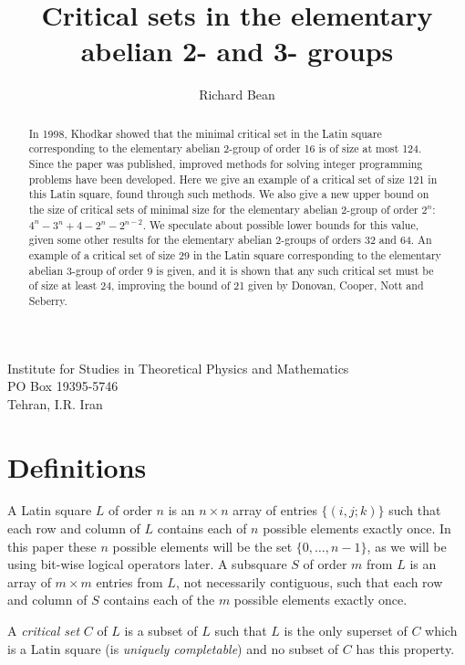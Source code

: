 \documentclass{article}
\title{Critical sets in the elementary abelian 2- and 3- groups}
\author{Richard Bean}
\date{}
\begin{document}
\maketitle

\begin{center}
Institute for Studies in Theoretical Physics and Mathematics \\
PO Box 19395-5746 \\
Tehran, I.R. Iran \\
\end{center}

\begin{abstract}

In 1998, Khodkar showed that the minimal critical set in the Latin
square corresponding to the elementary abelian 2-group of order 16
is of size at most 124.  Since the paper was published, improved
methods for solving integer programming problems have been
developed.  Here we give an example of a critical set of size 121
in this Latin square, found through such methods. We also give a
new upper bound on the size of critical sets of minimal size for
the elementary abelian 2-group of order $2^n$:
$4^{n}-3^{n}+4-2^{n}-2^{n-2}$. We speculate about possible lower
bounds for this value, given some other results for the elementary
abelian 2-groups of orders 32 and 64. An example of a critical set
of size 29 in the Latin square corresponding to the elementary
abelian 3-group of order 9 is given, and it is shown that any such
critical set must be of size at least 24, improving the bound of
21 given by Donovan, Cooper, Nott and Seberry.

\end{abstract}

\section{Definitions}
A Latin square $L$ of order $n$ is an $n \times n$ array of
entries $\{ (i,j;k) \}$ such that each row and column of $L$
contains each of $n$ possible elements exactly once. In this paper
these $n$ possible elements will be the set $\{ 0, \dots, n-1 \}$,
as we will be using bit-wise logical operators later.  A subsquare
$S$ of order $m$ from $L$ is an array of $m \times m$ entries from
$L$, not necessarily contiguous, such that each row and column of
$S$ contains each of the $m$ possible elements exactly once.

A {\it critical set} $C$ of $L$ is a subset of $L$ such that $L$
is the only superset of $C$ which is a Latin square (is {\it
uniquely completable}) and no subset of $C$ has this property.
\end{document}
